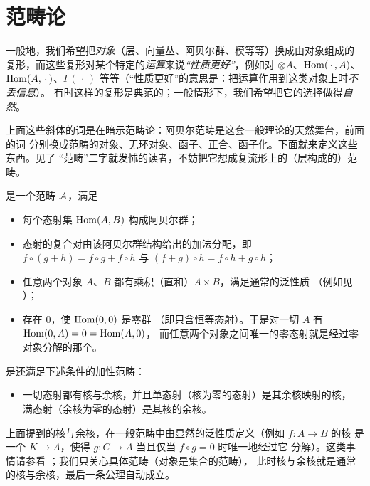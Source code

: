 \section{范畴论}\label{sec:cat}

一般地，我们希望把\emph{对象}（层、向量丛、阿贝尔群、模等等）换成由对象组成的
复形，而这些复形对某个特定的\emph{运算}来说\emph{“性质更好”}，例如对
$\otimes A$、$\operatorname{Hom}(\,\cdot\,,A)$、$\operatorname{Hom}(A,\,\cdot\,)$、$\Gamma(\,\cdot\,)$
等等（“性质更好”的意思是：把运算作用到这类对象上时\emph{不丢信息}）。
有时这样的复形是典范的；一般情形下，我们希望把它的选择做得\emph{自然}。

上面这些斜体的词是在暗示范畴论：阿贝尔范畴是这套一般理论的天然舞台，前面的词
分别换成范畴的对象、无环对象、函子、正合、函子化。下面就来定义这些东西。见了
“范畴”二字就发怵的读者，不妨把它想成复流形上的（层构成的）范畴。

\begin{definition}\label{def:additive}
是一个范畴 $\mathcal{A}$，满足
\begin{itemize}
\item 每个态射集 $\operatorname{Hom}(A,B)$ 构成阿贝尔群；
\item 态射的复合对由该阿贝尔群结构给出的加法分配，即
  $f\circ(g+h)=f\circ g+f\circ h$ 与 $(f+g)\circ h=f\circ h+g\circ h$；
\item 任意两个对象 $A$、$B$ 都有乘积（直和）$A\times B$，满足通常的泛性质
  （例如见 \cite{Ma}）；
\item 存在 $0$，使 $\operatorname{Hom}(0,0)$ 是零群
  （即只含恒等态射）。于是对一切 $A$ 有 $\operatorname{Hom}(0,A)=0=\operatorname{Hom}(A,0)$，
  而任意两个对象之间唯一的零态射就是经过零对象分解的那个。
\end{itemize}
是还满足下述条件的加性范畴：
\begin{itemize}
\item 一切态射都有核与余核，并且单态射（核为零的态射）是其余核映射的核，
  满态射（余核为零的态射）是其核的余核。
\end{itemize}
\end{definition}

上面提到的核与余核，在一般范畴中由显然的泛性质定义（例如 $f\colon A\to B$ 的核
是一个 $K\to A$，使得 $g\colon C\to A$ 当且仅当 $f\circ g=0$ 时唯一地经过它
分解）。这类事情请参看 \cite{Ma}；我们只关心具体范畴（对象是集合的范畴），
此时核与余核就是通常的核与余核，最后一条公理自动成立。

